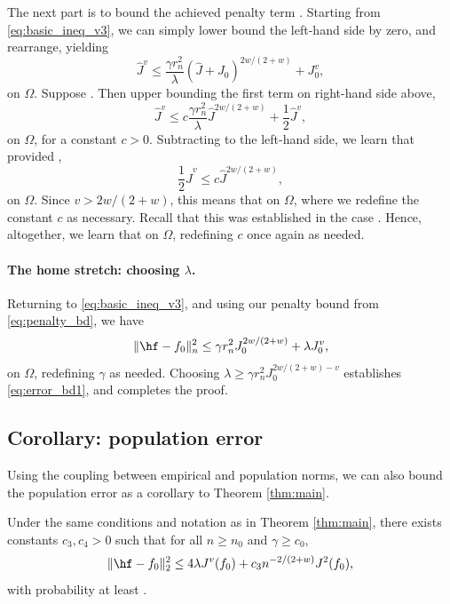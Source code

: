 \documentclass{article}
\begin{document}
The next part is to bound the achieved penalty term . Starting
from \eqref{eq:basic_ineq_v3}, we can simply lower bound the left-hand side by
zero, and rearrange, yielding 
\[
{\hat J}^v \leq \frac{\gamma r_n^2}{\lambda} ({\hat J} + J_0)^{2w/(2+w)} +
J_0^v, 
\]
on $\Omega$. Suppose . Then upper bounding the first term
on right-hand side above,
\[
{\hat J}^v \leq c \frac{\gamma r_n^2}{\lambda} {\hat J}^{2w/(2+w)} +
\frac{1}{2}{\hat J}^v, 
\]
on $\Omega$, for a constant $c>0$. Subtracting 
to the left-hand side, we learn that provided ,  
\begin{equation}
\label{eq:penalty_bd}
\frac{1}{2}{\hat J}^v \leq c {\hat J}^{2w/(2+w)},
\end{equation}
on $\Omega$. Since $v > 2w/(2+w)$, this means that  on
$\Omega$, where we redefine the constant $c$ as necessary. Recall that this was
established in the case .  Hence, altogether, we learn
that  on $\Omega$, redefining $c$ once
again as needed.     

\paragraph{The home stretch: choosing $\lambda$.}

Returning to \eqref{eq:basic_ineq_v3}, and using our penalty bound from
\eqref{eq:penalty_bd}, we have 
\[
\|\hf - f_0\|_n^2 \leq \gamma r_n^2 J_0^{2w/(2+w)} + \lambda J_0^v,
\]
on $\Omega$, redefining $\gamma$ as needed. Choosing $\lambda \geq \gamma r_n^2
J_0^{2w/(2+w)   - v}$ establishes \eqref{eq:error_bd1}, and completes the proof.          

\subsection{Corollary: population error}

Using the coupling between empirical and population norms, we can also bound the
population error as a corollary to Theorem \ref{thm:main}.

\begin{corollary}
\label{cor:main}
Under the same conditions and notation as in Theorem \ref{thm:main}, there
exists constants $c_3,c_4 > 0$ such that for all $n \geq n_0$ and $\gamma \geq
c_0$, 
\begin{equation}
\label{eq:error_bd3}
\|\hf - f_0\|_2^2 \leq 4 \lambda J^v(f_0) + c_3 n^{-2/(2+w)} J^2(f_0),
\end{equation}
with probability at least .  

\end{corollary}
\end{document}
